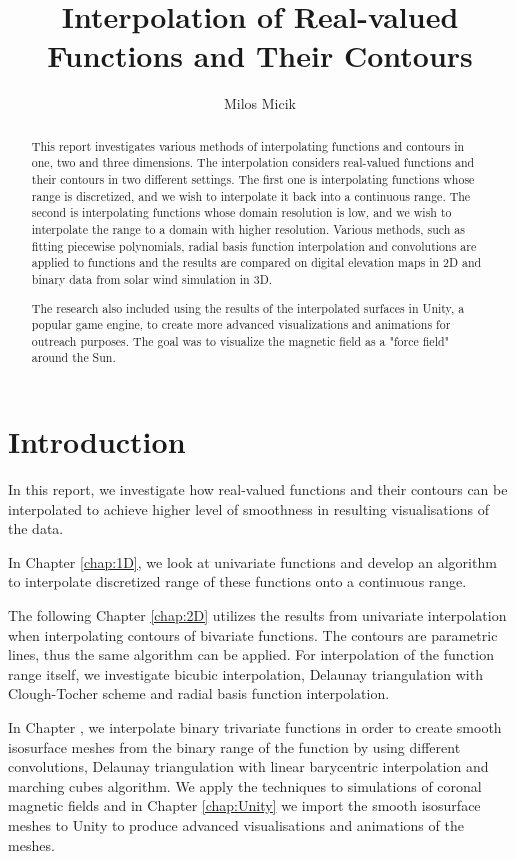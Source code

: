 \documentclass[a4paper,10pt]{report}
\title{Interpolation of Real-valued Functions and Their Contours}
\author{Milos Micik}
\begin{document}
\maketitle

\begin{abstract}
This report investigates various methods of interpolating functions and contours in one, two and three dimensions. The interpolation considers real-valued functions and their contours in two different settings. The first one is interpolating functions whose range is discretized, and we wish to interpolate it back into a continuous range. The second is interpolating functions whose domain resolution is low, and we wish to interpolate the range to a domain with higher resolution. Various methods, such as fitting piecewise polynomials, radial basis function interpolation and convolutions are applied to functions and the results are compared on digital elevation maps in 2D and binary data from solar wind simulation in 3D.

The research also included using the results of the interpolated surfaces in Unity, a popular game engine, to create more advanced visualizations and animations for outreach purposes. The goal was to visualize the magnetic field as a "force field" around the Sun.
\end{abstract}

\newpage
\tableofcontents
\newpage

\chapter{Introduction}
In this report, we investigate how real-valued functions and their contours can be interpolated to achieve higher level of smoothness in resulting visualisations of the data.

In Chapter \ref{chap:1D}, we look at univariate functions and develop an algorithm to interpolate discretized range of these functions onto a continuous range.

The following Chapter \ref{chap:2D} utilizes the results from univariate interpolation when interpolating contours of bivariate functions. The contours are parametric lines, thus the same algorithm can be applied. For interpolation of the function range itself, we investigate bicubic interpolation, Delaunay triangulation with Clough-Tocher scheme and radial basis function interpolation.

In Chapter \label{chap:3D}, we interpolate binary trivariate functions in order to create smooth isosurface meshes from the binary range of the function by using different convolutions, Delaunay triangulation with linear barycentric interpolation and marching cubes algorithm. We apply the techniques to simulations of coronal magnetic fields and in Chapter \ref{chap:Unity} we import the smooth isosurface meshes to Unity to produce advanced visualisations and animations of the meshes.
\end{document}
